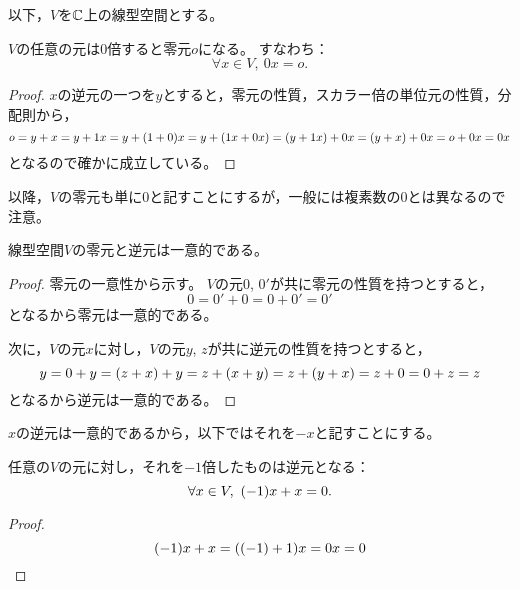 \documentclass[a4paper,draft]{ltjsarticle}
\begin{document}
以下，$V$を$\mathbb{C}$上の線型空間とする。

\begin{prop}
    $V$の任意の元は$0$倍すると零元$o$になる。
    すなわち：
    \begin{equation}
        \forall x\in V,\ 0x=o.
    \end{equation}
    \begin{proof}
        $x$の逆元の一つを$y$とすると，零元の性質，スカラー倍の単位元の性質，分配則から，
        \begin{equation}
            o=y+x=y+1x=y+\pare{1+0}x=y+\pare{1x+0x}=\pare{y+1x}+0x=\pare{y+x}+0x=o+0x=0x
        \end{equation}
        となるので確かに成立している。
    \end{proof}
\end{prop}

以降，$V$の零元も単に$0$と記すことにするが，一般には複素数の$0$とは異なるので注意。


\begin{prop}[零元・逆元の一意性]
    線型空間$V$の零元と逆元は一意的である。
    \begin{proof}
        零元の一意性から示す。
        $V$の元${0}$, ${0}'$が共に零元の性質を持つとすると，
        \begin{equation}
            {0}={0}'+{0}={0}+{0}'={0}'
        \end{equation}
        となるから零元は一意的である。

        次に，$V$の元${x}$に対し，$V$の元${y}$, ${z}$が共に逆元の性質を持つとすると，
        \begin{equation}
            {y}={0}+{y}=\pare{z+x}+y=z+\pare{x+y}=z+\pare{y+x}=z+0=0+z={z}
        \end{equation}
        となるから逆元は一意的である。
    \end{proof}
\end{prop}

$x$の逆元は一意的であるから，以下ではそれを$-x$と記すことにする。

\begin{prop}
    任意の$V$の元に対し，それを$-1$倍したものは逆元となる：
    \begin{equation}
        \forall x\in V,\ \pare{-1}x+x=0.
    \end{equation}
    \begin{proof}
        \begin{equation}
            \pare{-1}x+x=\pare{\pare{-1}+1}x=0x=0
        \end{equation}
    \end{proof}
\end{prop}
\end{document}
